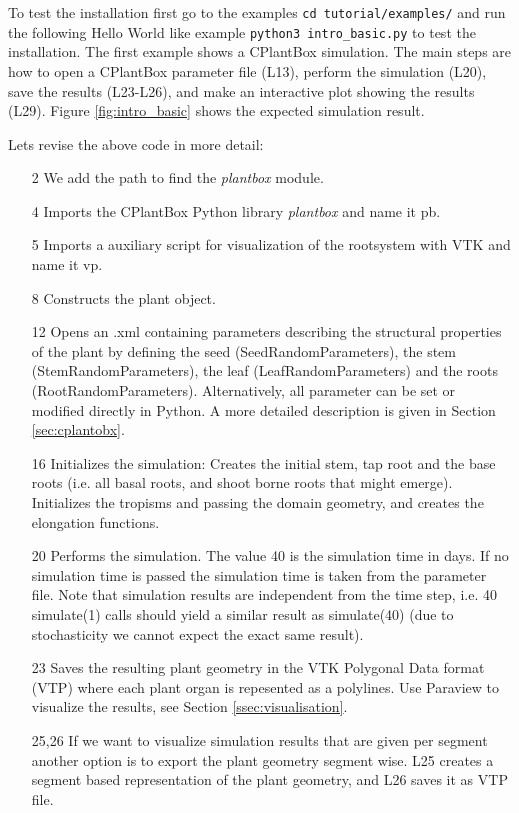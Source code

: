 To test the installation first go to the examples \lstinline{cd tutorial/examples/} and run the following Hello World like example \lstinline{python3 intro_basic.py} to test the installation. The first example shows a CPlantBox simulation. The main steps are how to open a CPlantBox parameter file (L13), perform the simulation (L20), save the results (L23-L26), and make an interactive plot showing the results (L29). Figure \ref{fig:intro_basic} shows the expected simulation result.  

 

\noindent 
Lets revise the above code in more detail: 
\begin{itemize}
 \item[2] We add the path to find the \emph{plantbox} module.
 \item[4] Imports the CPlantBox Python library \emph{plantbox} and name it pb.
 \item[5] Imports a auxiliary script for visualization of the rootsystem with VTK and name it vp.
 \item[8] Constructs the plant object.
 \item[12] Opens an .xml containing parameters describing the structural properties of the plant by defining the seed (SeedRandomParameters), the stem (StemRandomParameters), the leaf (LeafRandomParameters) and the roots (RootRandomParameters). Alternatively, all parameter can be set or modified directly in Python. A more detailed description is given in Section \ref{sec:cplantobx}.
 \item[16] Initializes the simulation: Creates the initial stem, tap root and the base roots
 (i.e. all basal roots, and shoot borne roots that might emerge). Initializes the tropisms and passing the domain geometry, 
 and creates the elongation functions. 
 \item[20] Performs the simulation. The value 40 is the simulation time in days. If no simulation time is passed the simulation time is taken from the parameter file. Note that simulation results are independent from the time step, i.e. 40 simulate(1) calls should yield a similar result 
 as simulate(40) (due to stochasticity we cannot expect the exact same result). 
 \item[23] Saves the resulting plant geometry in the VTK Polygonal Data format (VTP) where each plant organ is repesented as a polylines. Use Paraview to visualize the results, see Section \ref{ssec:visualisation}.
 \item[25,26] If we want to visualize simulation results that are given per segment another option is to export the plant geometry segment wise. L25 creates a segment based representation of the plant geometry, and L26 saves it as VTP file.

\end{itemize}
